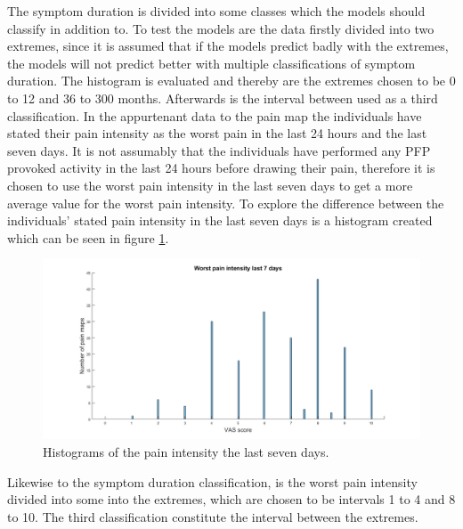 \noindent
The symptom duration is divided into some classes which the models should classify in addition to. To test the models are the data firstly divided into two extremes, since it is assumed that if the models predict badly with the extremes, the models will not predict better with multiple classifications of symptom duration. The histogram is evaluated and thereby are the extremes chosen to be 0 to 12 and 36 to 300 months. Afterwards is the interval between used as a third classification. 
\noindent
In the appurtenant data to the pain map the individuals have stated their pain intensity as the worst pain in the last 24 hours and the last seven days.
It is not assumably that the individuals have performed any PFP provoked activity in the last 24 hours before drawing their pain, therefore it is chosen to use the worst pain intensity in the last seven days to get a more average value for the worst pain intensity.
To explore the difference between the individuals’ stated pain intensity in the last seven days is a histogram created which can be seen in figure \ref{fig:histopain}.

\begin{figure} [H]
\centering
\includegraphics[width=1\textwidth]{figures/histrogramPain}
\caption{Histograms of the pain intensity the last seven days.}
\label{fig:histopain}
\end{figure}

\noindent
Likewise to the symptom duration classification, is the worst pain intensity divided into some into the extremes, which are chosen to be intervals 1 to 4 and 8 to 10. The third classification constitute the interval between the extremes.


